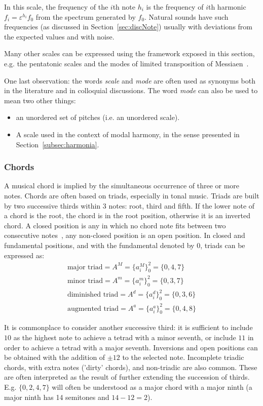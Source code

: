 In this scale, the frequency of the $i$th note $h_i$ is the frequency of $i$th harmonic $f_i=\varepsilon^{h_i} f_0$ from the spectrum generated by $f_0$. Natural sounds have such frequencies (as discussed in Section~\ref{sec:discNote}) usually with deviations from the expected values and with noise.

Many other scales can be expressed using the framework exposed in this section, e.g. the pentatonic scales and the modes of limited transposition of Messiaen~\cite{Messiaen}.

One last observation: the words \emph{scale} and \emph{mode} are often used as synonyms both in the literature and in colloquial discussions.
The word \emph{mode} can also be used to mean two other things:
\begin{itemize}
	\item an unordered set of pitches (i.e. an unordered scale).
	\item A scale used in the context of modal harmony, in the sense presented in Section~\ref{subsec:harmonia}.
\end{itemize}

\subsubsection{Chords}\label{subsec:acordes}
A musical chord is implied by the simultaneous occurrence of three or more notes. Chords are often based on triads, especially in tonal music. Triads are built by two successive thirds
within 3 notes: root, third and fifth. If the lower note of a chord is the root, the chord is in the root position, otherwise it is an inverted chord. A closed position is any in which no chord note fits between two consecutive
notes~\cite{Lacerda}, any non-closed position is an open position. In closed and fundamental positions,
and with the fundamental denoted by $0$, triads can be expressed as:
\begin{equation}\label{triades}
\begin{split}
\text{major triad} = A^M= \{a_i^M\}_0^2=\{0,4,7\} \\ 
\text{minor triad} = A^m = \{a_i^m\}_0^2=\{0,3,7\} \\
\text{diminished triad} = A^d = \{a_i^d\}_0^2=\{0,3,6\} \\
\text{augmented triad} = A^a = \{a_i^a\}_0^2=\{0,4,8\}
\end{split}
\end{equation}

It is commonplace to consider another successive third: it is sufficient to include $10$ as the highest note to achieve a tetrad with a minor seventh, or include $11$ in order to achieve a tetrad with a major
seventh. Inversions and open positions can be obtained with the 
addition of $\pm 12$ to the selected note. Incomplete triadic chords, with extra notes ('dirty' chords), and non-triadic
are also common.
These are often interpreted as the result of further extending the succession of thirds.
E.g. $\{0,2,4,7\}$ will often be understood as a major chord with a major ninth (a major ninth has 14 semitones and $14-12 = 2$).

